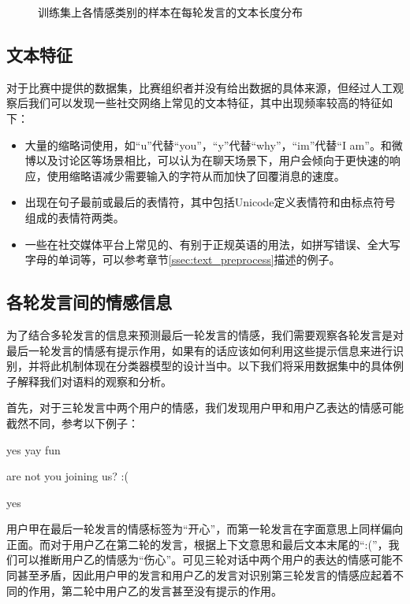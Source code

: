 \begin{figure}[h]
  \caption{训练集上各情感类别的样本在每轮发言的文本长度分布}

  \label{fig:context_emo_train_class_len}
\end{figure}

\subsection{文本特征}
\label{ssec:exp_context_emo_data_text}

对于比赛中提供的数据集，比赛组织者并没有给出数据的具体来源，但经过人工观察后我们可以发现一些社交网络上常见的文本特征，其中出现频率较高的特征如下：

\begin{itemize}

\item 大量的缩略词使用，如“u”代替“you”，“y”代替“why”，“im”代替“I am”。和微博以及讨论区等场景相比，可以认为在聊天场景下，用户会倾向于更快速的响应，使用缩略语减少需要输入的字符从而加快了回覆消息的速度。

\item 出现在句子最前或最后的表情符，其中包括Unicode定义表情符和由标点符号组成的表情符两类。

\item 一些在社交媒体平台上常见的、有别于正规英语的用法，如拼写错误、全大写字母的单词等，可以参考章节\ref{ssec:text_preprocess}描述的例子。

\end{itemize}

\subsection{各轮发言间的情感信息}
\label{ssec:exp_context_emo_multi_turn_analyse}

为了结合多轮发言的信息来预测最后一轮发言的情感，我们需要观察各轮发言是对最后一轮发言的情感有提示作用，如果有的话应该如何利用这些提示信息来进行识别，并将此机制体现在分类器模型的设计当中。以下我们将采用数据集中的具体例子解释我们对语料的观察和分析。

首先，对于三轮发言中两个用户的情感，我们发现用户甲和用户乙表达的情感可能截然不同，参考以下例子：

 yes yay fun\par
{} are not you joining us? :( \par
{} yes\par

用户甲在最后一轮发言的情感标签为“开心”，而第一轮发言在字面意思上同样偏向正面。而对于用户乙在第二轮的发言，根据上下文意思和最后文本末尾的“:(”，我们可以推断用户乙的情感为“伤心”。可见三轮对话中两个用户的表达的情感可能不同甚至矛盾，因此用户甲的发言和用户乙的发言对识别第三轮发言的情感应起着不同的作用，第二轮中用户乙的发言甚至没有提示的作用。


